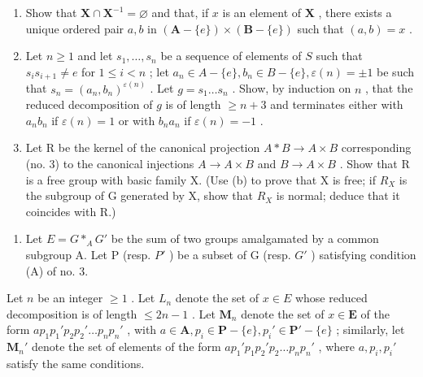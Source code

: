 \begin{enumerate}
\def\labelenumi{(\alph{enumi})}
\item
  Show that \(\mathbf{X} \cap \mathbf{X}^{-1} = \varnothing\) and that, if \(x\) is an element of \(\mathbf{X}\) , there exists a unique ordered pair \(a, b\) in \((\mathbf{A} - \{e\}) \times (\mathbf{B} - \{e\})\) such that \((a, b) = x\) .
\item
  Let \(n \geqslant 1\) and let \(s_1, \ldots, s_n\) be a sequence of elements of \(S\) such that \(s_i s_{i+1} \neq e\) for \(1 \leqslant i < n\) ; let \(a_n \in A - \{e\}, b_n \in B - \{e\}, \varepsilon(n) = \pm 1\) be such that \(s_n = (a_n, b_n)^{\varepsilon(n)}\) . Let \(g = s_1 \ldots s_n\) . Show, by induction on \(n\) , that the reduced decomposition of \(g\) is of length \(\geqslant n + 3\) and terminates either with \(a_nb_n\) if \(\varepsilon(n) = 1\) or with \(b_na_n\) if \(\varepsilon(n) = -1\) .
\item
  Let R be the kernel of the canonical projection \(A*B \rightarrow A \times B\) corresponding (no. 3) to the canonical injections \(A \rightarrow A \times B\) and \(B \rightarrow A \times B\) . Show that R is a free group with basic family X. (Use (b) to prove that X is free; if \(R_{X}\) is the subgroup of G generated by X, show that \(R_{X}\) is normal; deduce that it coincides with R.)
\end{enumerate}

\begin{enumerate}
\def\labelenumi{\arabic{enumi}.}
\setcounter{enumi}{32}
\tightlist
\item
  Let \(E = G *_{A} G'\) be the sum of two groups amalgamated by a common subgroup A. Let P (resp. \(P'\) ) be a subset of G (resp. \(G'\) ) satisfying condition (A) of no. 3.
\end{enumerate}

Let \(n\) be an integer \(\geqslant 1\) . Let \(L_n\) denote the set of \(x \in E\) whose reduced decomposition is of length \(\leqslant 2n - 1\) . Let \(\mathbf{M}_n\) denote the set of \(x \in \mathbf{E}\) of the form \(ap_1p_1'p_2p_2'\ldots p_np_n'\) , with \(a \in \mathbf{A}, p_i \in \mathbf{P} - \{e\}, p_i' \in \mathbf{P}' - \{e\}\) ; similarly, let \(\mathbf{M}_n'\) denote the set of elements of the form \(ap_1'p_1p_2'p_2\ldots p_np_n'\) , where \(a, p_i, p_i'\) satisfy the same conditions.

